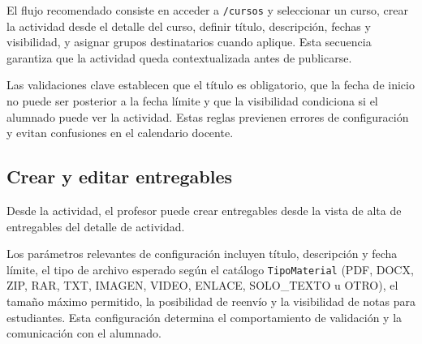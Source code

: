 


El flujo recomendado consiste en acceder a \texttt{/cursos} y seleccionar un curso, crear la actividad desde el detalle del curso, definir t\'itulo, descripci\'on, fechas y visibilidad, y asignar grupos destinatarios cuando aplique. Esta secuencia garantiza que la actividad queda contextualizada antes de publicarse.

Las validaciones clave establecen que el t\'itulo es obligatorio, que la fecha de inicio no puede ser posterior a la fecha l\'imite y que la visibilidad condiciona si el alumnado puede ver la actividad. Estas reglas previenen errores de configuraci\'on y evitan confusiones en el calendario docente.

\subsection{Crear y editar entregables}

Desde la actividad, el profesor puede crear entregables
desde la vista de alta de entregables del detalle de actividad.




Los par\'ametros relevantes de configuraci\'on incluyen t\'itulo, descripci\'on y fecha l\'imite, el tipo de archivo esperado seg\'un el cat\'alogo \texttt{TipoMaterial} (PDF, DOCX, ZIP, RAR, TXT, IMAGEN, VIDEO, ENLACE, SOLO\_TEXTO u OTRO), el tama\~no m\'aximo permitido, la posibilidad de reenv\'io y la visibilidad de notas para estudiantes. Esta configuraci\'on determina el comportamiento de validaci\'on y la comunicaci\'on con el alumnado.

